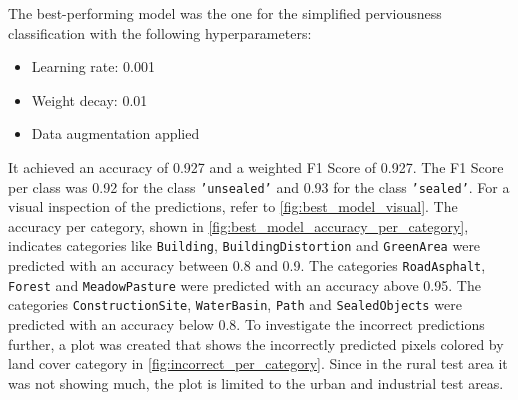 The best-performing model was the one for the simplified perviousness classification
with the following hyperparameters:
\begin{itemize}
    \item Learning rate: 0.001
    \item Weight decay: 0.01
    \item Data augmentation applied
\end{itemize}
It achieved an accuracy of 0.927 and a weighted F1 Score of 0.927.
The F1 Score per class was 0.92 for the class \texttt{'unsealed'} and 0.93 for the class \texttt{'sealed'}.
For a visual inspection of the predictions, refer to \autoref{fig:best_model_visual}.
The accuracy per category, shown in \autoref{fig:best_model_accuracy_per_category}, indicates categories
like \texttt{Building}, \texttt{BuildingDistortion} and \texttt{GreenArea} were predicted with an accuracy between 0.8 and 0.9.
The categories \texttt{RoadAsphalt}, \texttt{Forest} and \texttt{MeadowPasture} were predicted with an accuracy above 0.95.
The categories \texttt{ConstructionSite}, \texttt{WaterBasin}, \texttt{Path} and \texttt{SealedObjects} were predicted with
an accuracy below 0.8. To investigate the incorrect predictions further, a plot was created that shows the incorrectly
predicted pixels colored by land cover category in \autoref{fig:incorrect_per_category}. Since in the
rural test area it was not showing much, the plot is limited to the urban and industrial test areas.


